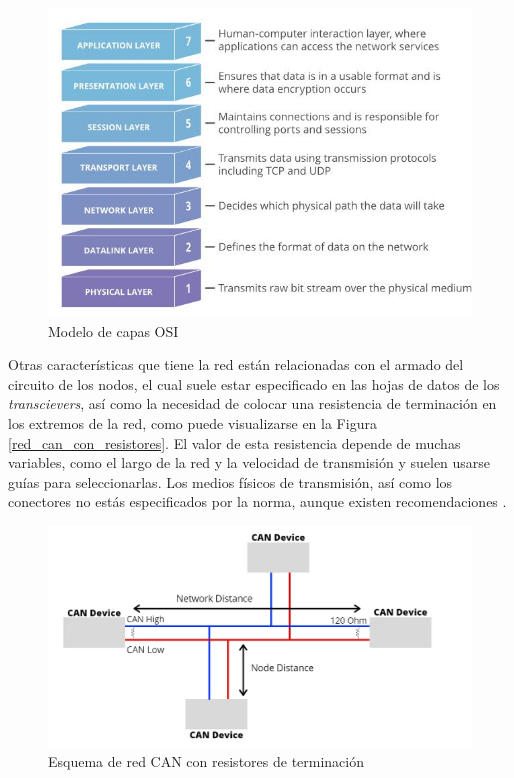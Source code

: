 \begin{figure}[htbp]
	\centering
	\includegraphics[scale=.8]{./Figures/OSI_model.JPG}
	\caption{Modelo de capas OSI\protect\footnotemark}
	\label{fig:modeloOsi}
\end{figure}



Otras características que tiene la red están relacionadas con el armado del circuito de los nodos, el cual suele estar especificado en las hojas de datos de los \textit{transcievers}, así como la necesidad de colocar una resistencia de terminación en los extremos de la red, como puede visualizarse en la Figura \ref{red_can_con_resistores}. El valor de esta resistencia depende de muchas variables, como el largo de la red y la velocidad de transmisión y suelen usarse guías para seleccionarlas. Los medios físicos de transmisión, así como los conectores no estás especificados por la norma, aunque existen recomendaciones \citep{Embedded_Networking_CAN}.

\begin{figure}[htbp]
	\centering
	\includegraphics[scale=.6]{./Figures/canBus.png}
	\caption{Esquema de red CAN con resistores de terminación\protect\footnotemark}
	\label{fig:red_can_con_resistores}
\end{figure}

